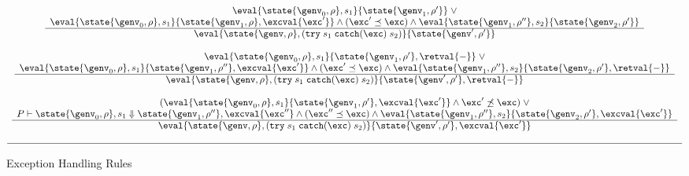 \begin{figure}
\begin{displaymath}
\begin{array}{c}
\ \\
\begin{array}{c}
\eval{\state{\genv_0,\rho},s_1}{\state{\genv_1,\rho'}} \;\vee  \\
\eval{\state{\genv_0,\rho},s_1}{\state{\genv_1,\rho},\excval{\exc'}} \wedge (\exc' \preceq \exc) \wedge \eval{\state{\genv_1,\rho''},{s_2}}{\state{\genv_2,\rho'}}   \\
\hline
\eval{\state{\genv,\rho},{(\texttt{try}\;s_1\;\texttt{catch}(\exc)\;s_2)}}{\state{\genv',\rho'}}
\end{array} \\
\ \\
\begin{array}{c}
\eval{\state{\genv_0,\rho},s_1}{\state{\genv_1,\rho'},\retval{-}}\; \vee \\
\eval{\state{\genv_0,\rho},s_1}{\state{\genv_1,\rho''},\excval{\exc'}} \wedge (\exc' \preceq \exc) \wedge \eval{\state{\genv_1,\rho''},{s_2}}{\state{\genv_2,\rho'},\retval{-}}   \\
\hline
\eval{\state{\genv,\rho},{(\texttt{try}\;s_1\;\texttt{catch}(\exc)\; s_2)}}{\state{\genv',\rho'},\retval{-}}
\end{array} \\
\ \\
\begin{array}{c}
(\eval{\state{\genv_0,\rho},s_1}{\state{\genv_1,\rho'},\excval{\exc'}} \wedge \exc'\not\preceq\exc)\; \vee \\
P \vdash \state{\genv_0,\rho},s_1 \Downarrow \state{\genv_1,\rho''},\excval{\exc''} \wedge (\exc'' \preceq \exc) \wedge \eval{\state{\genv_1,\rho''},{s_2}}{\state{\genv_2,\rho'},\excval{\exc'}}   \\
\hline
\eval{\state{\genv,\rho},{(\texttt{try}\;s_1\;\texttt{catch}(\exc)\; s_2)}}{\state{\genv',\rho'},\excval{\exc'}}
\end{array} \\
\ \\
\hline
\end{array}
\end{displaymath}
\caption{Exception Handling Rules}\label{fig:bigstep-exceptions}
\end{figure}





























